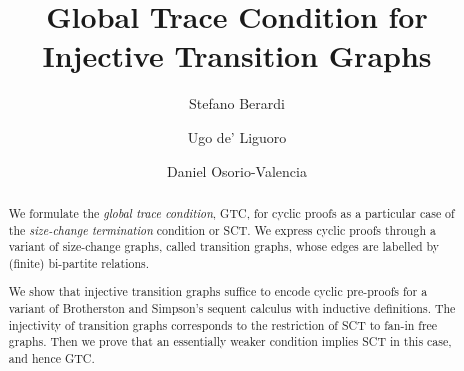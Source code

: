 \documentclass[a4paper,UKenglish,cleveref, autoref, thm-restate]{lipics-v2021}
\title{Global Trace Condition for Injective Transition Graphs} %
\author{Stefano Berardi}
           {University of Turin, Turin, Italy}
           {stefano.berardi@unito.it}
           {}
           {}
\author{Ugo {de' Liguoro}}
           {University of Turin, Turin, Italy}
           {ugo.deliguoro@unito.it}
           {https://orcid.org/0000-0003-4609-2783}
           {}
\author{Daniel Osorio-Valencia}
           {University of Turin, Turin, Italy}
           {danielfabian.osoriovalencia@unito.it}
           {https://orcid.org/0009-0002-4820-1867}
           {}
\begin{document}
\maketitle

\begin{abstract}
We formulate the {\em global trace condition}, GTC, for cyclic proofs as a particular case of the {\em size-change termination} condition or SCT. We express cyclic proofs through a variant of size-change graphs, called transition graphs, whose edges are labelled by (finite) bi-partite relations. 

We show that injective transition graphs suffice to encode cyclic pre-proofs for a variant of Brotherston and Simpson's sequent calculus with inductive definitions. 
The injectivity of transition graphs corresponds to the restriction of SCT to fan-in free graphs.
Then we prove that an essentially weaker condition implies SCT in this case, and hence GTC.
\end{abstract}













\newpage


\end{document}
